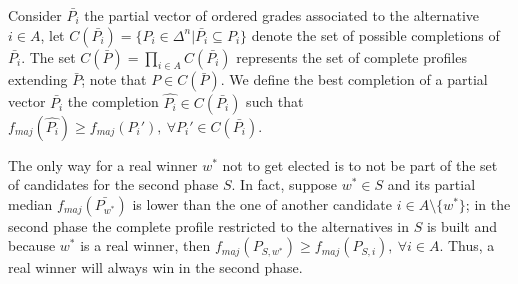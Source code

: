 \documentclass[version=3.21, pagesize, twoside=off, bibliography=totoc, DIV=calc, fontsize=12pt, a4paper]{scrartcl}
\begin{document}
Consider $\bar{P_i}$ the partial vector of ordered grades associated to the alternative $i\in A$, let $C(\bar{P_i}) = \{P_i \in \Delta^n | \bar{P_i} \subseteq P_i\}$ denote the set of possible completions of $\bar{P_i}$. 
The set $C(\bar{P}) = \prod_{i \in A} C(\bar{P_i})$ represents the set of complete profiles extending $\bar{P}$; note that $P \in C(\bar{P})$. We define the best completion of a partial vector $\bar{P_i}$ the completion $\hat{P_i}\in C(\bar{P_i})$ such that $f_{maj}(\hat{P_i})\geq f_{maj}(P_i'), \ \forall P_i' \in C(\bar{P_i})$. 

The only way for a real winner $w^*$ not to get elected is to not be part of the set of candidates for the second phase $S$. 
In fact, suppose $w^*\in S$ and its partial median $f_{maj}(\bar{P_{w^*}})$ is lower than the one of another candidate $i\in A\setminus\{w^*\}$; in the second phase the complete profile restricted to the alternatives in $S$ is built and because $w^*$ is a real winner, then $f_{maj}(P_{S, w^*})\geq f_{maj}(P_{S, i}), \ \forall i \in A$. Thus, a real winner will always win in the second phase. 
\end{document}
